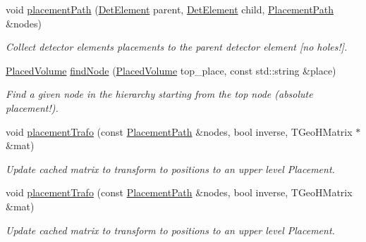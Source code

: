 \begin{DoxyCompactItemize}
void \hyperlink{namespace_d_d4hep_1_1_geometry_1_1_detector_tools_ae4ebaffda73014e393cf33ea3bfe0870}{placementPath} (\hyperlink{class_d_d4hep_1_1_geometry_1_1_det_element}{DetElement} parent, \hyperlink{class_d_d4hep_1_1_geometry_1_1_det_element}{DetElement} child, \hyperlink{namespace_d_d4hep_1_1_geometry_1_1_detector_tools_a6cc33285199e04dd336a33e6e62925e6}{PlacementPath} \&nodes)
\begin{DoxyCompactList}\small\item\em Collect detector elements placements to the parent detector element \mbox{[}no holes!\mbox{]}. \item\end{DoxyCompactList}\item 
\hyperlink{class_d_d4hep_1_1_geometry_1_1_placed_volume}{PlacedVolume} \hyperlink{namespace_d_d4hep_1_1_geometry_1_1_detector_tools_a82d2f181b2755d1fbd749c30b7dd21c1}{findNode} (\hyperlink{class_d_d4hep_1_1_geometry_1_1_placed_volume}{PlacedVolume} top\_\-place, const std::string \&place)
\begin{DoxyCompactList}\small\item\em Find a given node in the hierarchy starting from the top node (absolute placement!). \item\end{DoxyCompactList}\item 
void \hyperlink{namespace_d_d4hep_1_1_geometry_1_1_detector_tools_a08fe6233324d561934a33569d4548435}{placementTrafo} (const \hyperlink{namespace_d_d4hep_1_1_geometry_1_1_detector_tools_a6cc33285199e04dd336a33e6e62925e6}{PlacementPath} \&nodes, bool inverse, TGeoHMatrix $\ast$\&mat)
\begin{DoxyCompactList}\small\item\em Update cached matrix to transform to positions to an upper level Placement. \item\end{DoxyCompactList}\item 
void \hyperlink{namespace_d_d4hep_1_1_geometry_1_1_detector_tools_a33a0bf01d4cc18da281b63e2e865c97a}{placementTrafo} (const \hyperlink{namespace_d_d4hep_1_1_geometry_1_1_detector_tools_a6cc33285199e04dd336a33e6e62925e6}{PlacementPath} \&nodes, bool inverse, TGeoHMatrix \&mat)
\begin{DoxyCompactList}\small\item\em Update cached matrix to transform to positions to an upper level Placement. \item\end{DoxyCompactList}\item 

\end{DoxyCompactItemize}
